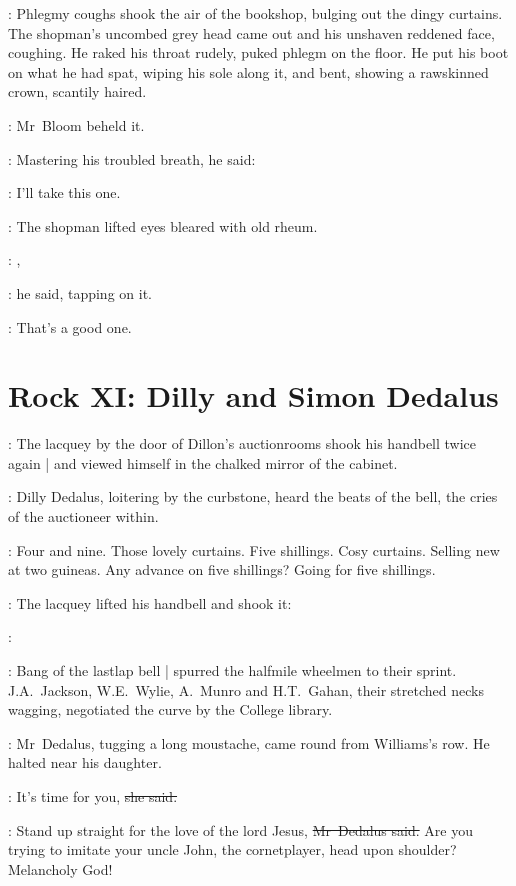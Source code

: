 :
Phlegmy coughs shook the air of the bookshop,
bulging out the dingy curtains.
The shopman's uncombed grey head came out
and his unshaven reddened face,
coughing.
He raked his throat rudely,
puked phlegm on the floor.
He put his boot on what he had spat,
wiping his sole along it,
and bent,
showing a rawskinned crown,
scantily haired.

:
Mr~Bloom beheld it.

:
Mastering his troubled breath,
he said:

\Bloom:
I'll take this one.

:
The shopman lifted eyes%
bleared with old rheum.

\shopman:
,

:
he said,
tapping on it.

\shopman:
That's a good one.


\section*{Rock XI: Dilly and Simon Dedalus}


:
The lacquey by the door of Dillon's auctionrooms
shook his handbell
twice again |
and viewed himself in the chalked mirror of the cabinet.

:
Dilly Dedalus,
loitering by the curbstone,
heard the beats of the bell,
the cries of the auctioneer within.

\auctioneer:
Four and nine.
Those lovely curtains.
Five shillings.
Cosy curtains.
Selling new at two guineas.
Any advance on five shillings?
Going for five shillings.

:
The lacquey lifted his handbell and shook it:

\bell:
%

\begin{interject}
    :
    Bang of the lastlap bell |
    spurred the halfmile wheelmen to their sprint.
    J.A.~Jackson,
    W.E.~Wylie,
    A.~Munro
    and H.T.~Gahan,
    their stretched necks wagging,
    negotiated the curve by the College library.
\end{interject}

:
Mr~Dedalus,
tugging a long moustache,
came round from Williams's row.
He halted near his daughter.

\dilly:
It's time for you,
\sout{she said.}

\simon:
Stand up straight for the love of the lord Jesus,
\sout{Mr~Dedalus said.}
Are you trying to imitate your uncle John,
the cornetplayer,
head upon shoulder?
Melancholy God!

